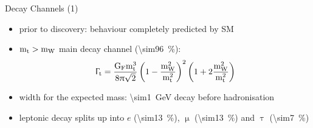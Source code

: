 \begin{frame}{Decay Channels (1)}

	\begin{itemize}\itemfill
		\item prior to discovery: behaviour completely predicted by SM
		\item $\text{m}_{\text{t}} > \text{m}_{\text{W}}$ \ra main decay channel (\SI{\sim96}{\%}):
		\begin{equation*} \Upgamma_{\text{t}} = \frac{\text{G}_{\text{F}}\text{m}_{\text{t}}^{3}}{8\uppi\sqrt{2}}\left(1 - \frac{\text{m}_{\text{W}}^{2}}{\text{m}_{\text{t}}^{2}}\right)^{2}\left(1 + 2\frac{\text{m}_{\text{W}}^{2}}{\text{m}_{\text{t}}^{2}}\right)\end{equation*}
		\item width for the expected mass: \SI{\sim1}{\giga\electronvolt} \ra decay before hadronisation
	\end{itemize}
	
	\begin{figure}\vspace*{-10pt}
		\centering
	\end{figure}\vspace*{-10pt}
	
	\begin{itemize}\itemfill
		\item leptonic decay splits up into $e$ (\SI{\sim13}{\%}), $\upmu$ (\SI{\sim13}{\%}) and $\uptau$ (\SI{\sim7}{\%})
	\end{itemize}

\end{frame}
